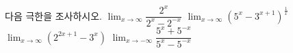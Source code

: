 다음 극한을 조사하시오.
 $\displaystyle\lim_{x\to\infty}\dfrac{2^x}{2^x-2^{-x}}$
 $\displaystyle\lim_{x\to\infty}(5^x-3^{x+1})^{\frac{1}{x}}$
 $\displaystyle\lim_{x\to\infty}(2^{2x+1}-3^x)$
 $\displaystyle\lim_{x\to -\infty}\dfrac{5^x+5^{-x}}{5^x-5^{-x}}$
